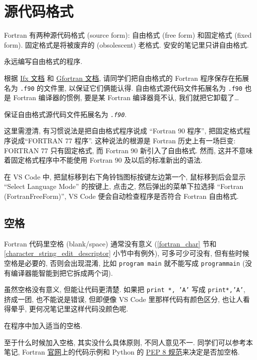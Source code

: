 \section{源代码格式}

Fortran 有两种源代码格式 (source form): 自由格式 (free form) 和固定格式 (fixed form). 固定格式是将被废弃的 (obsolescent) 老格式. 安安的笔记里只讲自由格式.
\begin{convention}
    永远编写自由格式的程序.
\end{convention}

根据 \href{https://cdrdv2.intel.com/v1/dl/getContent/824360?fileName=fortran-compiler_developer-guide-reference_2024.2-767251-824360.pdf}{Ifx 文档} 和 \href{https://gcc.gnu.org/onlinedocs/gcc-13.2.0/gfortran.pdf}{Gfortran 文档}, 请同学们把自由格式的 Fortran 程序保存在拓展名为 \texttt{.f90} 的文件里, 以保证它们俩能认得. 自由格式源代码文件拓展名为 \texttt{.f90} 也是 Fortran 编译器的惯例, 要是某 Fortran 编译器竟不认, 我们就把它卸载了\dots{}
\begin{convention}
    保证自由格式源代码文件拓展名为 \texttt{\emph{.f90}}.
\end{convention}

这里需澄清, 有习惯说法是把自由格式程序说成 ``Fortran 90 程序'', 把固定格式程序说成``FORTRAN 77 程序''. 这种说法的根源是 Fortran 历史上有一场巨变: FORTRAN 77 只有固定格式, 而 Fortran 90 新引入了自由格式. 然而, 这并不意味着固定格式程序中不能使用 Fortran 90 及以后的标准新出的语法.

在 VS Code 中, 把鼠标移到右下角铃铛图标按键左边第一个, 鼠标移到后会显示 ``Select Language Mode'' 的按键上, 点击之, 然后弹出的菜单下拉选择 ``Fortran (FortranFreeForm)'', VS Code 便会自动检查程序是否符合 Fortran 自由格式.

\subsection{空格}

Fortran 代码里空格 (blank/space) 通常没有意义 (\ref{fortran_char} 节和 \ref{character_string_edit_descriptor} 小节中有例外), 可多可少可没有, 但有些时候空格是必要的, 否则会出现混淆, 比如 \texttt{program main} 就不能写成 \texttt{programmain} (没有编译器能智能到把它拆成两个词).

虽然空格没有意义, 但能让代码更清楚. 如果把 \texttt{print *, 'A'} 写成 \texttt{print*,'A'}, 挤成一团, 也不能说是错误, 但即便像 VS Code 里那样代码有颜色区分, 也让人看得晕乎, 更何况笔记里这样代码没颜色呢.
\begin{convention}
    在程序中加入适当的空格.\label{fortran_blank}
\end{convention}
至于什么时候加入空格, 其实没什么具体原则, 不同人意见不一. 同学们可以参考本笔记,  Fortran \href{https://fortran-lang.org/}{官网}上的代码示例和 Python 的 \href{https://peps.python.org/pep-0008/}{PEP 8 规范}来决定是否加空格.

